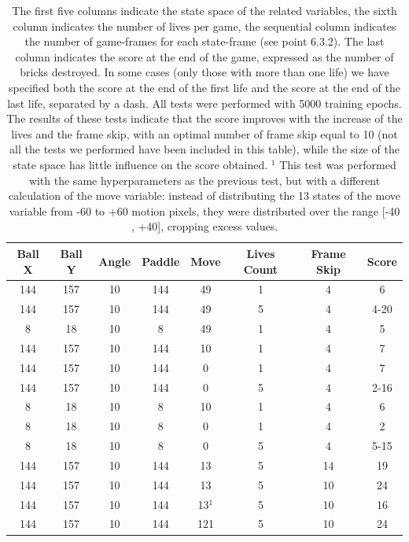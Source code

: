\begin{table}[h]
	\centering
	\begin{tabular}{*{8}{c}}
		Ball X & Ball Y & Angle & Paddle & Move & Lives Count & Frame Skip & Score \\
		\hline
		144 & 157 & 10 & 144 & 49 & 1 & 4 & 6 \\
		144 & 157 & 10 & 144 & 49 & 5 & 4 & 4-20 \\
		8 & 18 & 10 & 8 & 49 & 1 & 4 & 5 \\
		144 & 157 & 10 & 144 & 10 & 1 & 4 & 7 \\
		144 & 157 & 10 & 144 & 0 & 1 & 4 & 7 \\
		144 & 157 & 10 & 144 & 0 & 5 & 4 & 2-16 \\
		8 & 18 & 10 & 8 & 10 & 1 & 4 & 6 \\
		8 & 18 & 10 & 8 & 0 & 1 & 4 & 2 \\
		8 & 18 & 10 & 8 & 0 & 5 & 4 & 5-15 \\
		\hline
		144 & 157 & 10 & 144 & 13 & 5 & 14 & 19 \\
		144 & 157 & 10 & 144 & 13 & 5 & 10 & 24 \\
		144 & 157 & 10 & 144 & 13$^1$ & 5 & 10 & 16 \\
		144 & 157 & 10 & 144 & 121 & 5 & 10 & 24 \\
	\end{tabular}
	\caption{The first five columns indicate the state space of the related variables, the sixth column indicates the number of lives per game, the sequential column indicates the number of game-frames for each state-frame (see point 6.3.2). The last column indicates the score at the end of the game, expressed as the number of bricks destroyed. In some cases (only those with more than one life) we have specified both the score at the end of the first life and the score at the end of the last life, separated by a dash. All tests were performed with 5000 training epochs. The results of these tests indicate that the score improves with the increase of the lives and the frame skip, with an optimal number of frame skip equal to 10 (not all the tests we performed have been included in this table), while the size of the state space has little influence on the score obtained. $^1$ This test was performed with the same hyperparameters as the previous test, but with a different calculation of the move variable: instead of distributing the 13 states of the move variable from -60 to +60 motion pixels, they were distributed over the range [-40 , +40], cropping excess values.}
\end{table}

